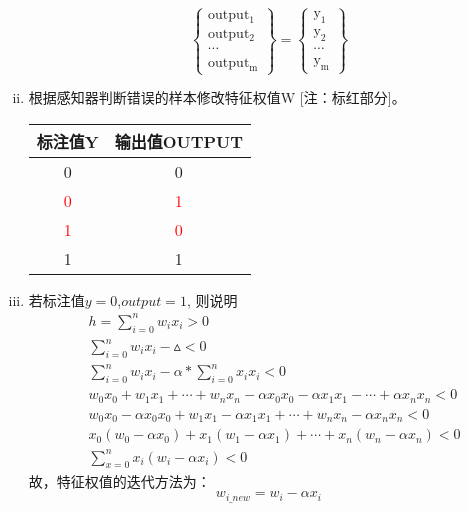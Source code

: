 \documentclass{article}
\begin{document}
\begin{CJK*}{UTF8}{gbsn}
\begin{enumerate}[(i)]
$$\mathrm{
\left\{
 \begin{matrix}
   output_{1} \\
   output_{2} \\
   \cdots \\
   output_{m} 
  \end{matrix}
  \right\}
 =
 \left\{
 \begin{matrix}
   y_{1} \\
   y_{2} \\
   \cdots \\
   y_{m} 
  \end{matrix}
  \right\}
}$$
\item 根据感知器判断错误的样本修改特征权值W [注：标红部分]。 \\
\begin{tabular}{|c|c|}%
\hline  %
标注值Y&输出值OUTPUT\\
\hline
0&0\\
\hline %
\textcolor{red}{0}&\textcolor{red}{1}\\

\hline  %
\textcolor{red}{1}&\textcolor{red}{0}\\
\hline %
1&1\\
\hline %
\end{tabular}

\item 若标注值$y=0$,$output=1$, 则说明
$$
\begin{aligned}
& h = \sum_{i=0}^{n} w_{i}x_{i} > 0 \\
& \sum_{i=0}^{n} w_{i}x_{i} - \vartriangle < 0 \\
& \sum_{i=0}^{n} w_{i}x_{i} - \alpha * \sum_{i=0}^{n}x_{i}x_{i} < 0 \\
& w_{0}x_{0} + w_{1}x_{1} + \cdots + w_{n}x_{n} - \alpha x_{0}x_{0} - \alpha x_{1}x_{1}-\cdots + \alpha x_{n}x_{n} < 0 \\
& w_{0}x_{0}- \alpha x_{0}x_{0} + w_{1}x_{1} - \alpha x_{1}x_{1}+ \cdots + w_{n}x_{n} - \alpha x_{n}x_{n} < 0 \\
& x_{0} \left(w_{0}-\alpha x_{0}\right)+x_{1} \left(w_{1}-\alpha x_{1}\right)+\cdots + x_{n} \left(w_{n}-\alpha x_{n}\right) < 0 \\
& \sum_{x=0}^{n} x_{i} \left(w_{i}-\alpha x_{i}\right) < 0
\end{aligned}
$$
故，特征权值的迭代方法为：
\begin{equation}
w_{i\_new}=w_{i} - \alpha x_{i} 
\end{equation}


\end{enumerate}
\end{CJK*}
\end{document}
